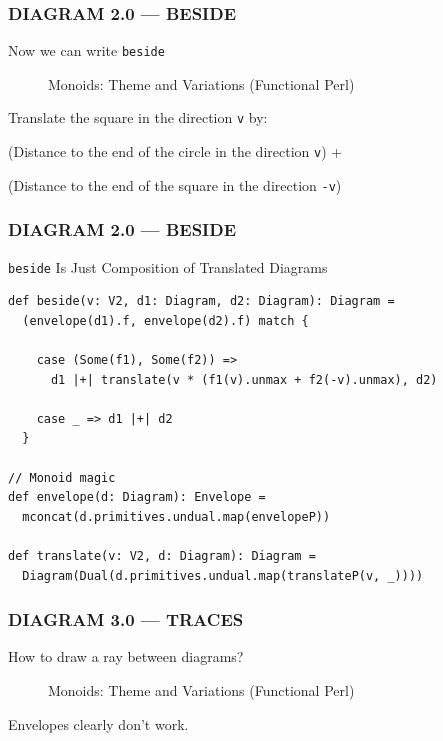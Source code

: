 \documentclass{beamer}
\begin{document}
\begin{frame} \frametitle{DIAGRAM 2.0 --- BESIDE}
Now we can write \texttt{beside}
  \begin{figure}
      \centering
      \caption{Monoids: Theme and Variations (Functional Perl)}
  \end{figure}
  \vspace{-.5cm}
  Translate the square in the direction \texttt{v} by:

  (Distance to the end of the circle in the direction \texttt{v}) +

  (Distance to the end of the square in the direction \texttt{-v})
\end{frame}

\begin{frame}[fragile] \frametitle{DIAGRAM 2.0 --- BESIDE}
  \begin{block}{\texttt{beside} Is Just Composition of Translated Diagrams}
  \begin{lstlisting}
def beside(v: V2, d1: Diagram, d2: Diagram): Diagram =
  (envelope(d1).f, envelope(d2).f) match {

    case (Some(f1), Some(f2)) =>
      d1 |+| translate(v * (f1(v).unmax + f2(-v).unmax), d2)

    case _ => d1 |+| d2
  }

// Monoid magic
def envelope(d: Diagram): Envelope =
  mconcat(d.primitives.undual.map(envelopeP))

def translate(v: V2, d: Diagram): Diagram =
  Diagram(Dual(d.primitives.undual.map(translateP(v, _))))
  \end{lstlisting}
  \vspace{-0.4cm}
  \end{block}
\end{frame}

\begin{frame} \frametitle{DIAGRAM 3.0 --- TRACES}
How to draw a ray between diagrams?

  \begin{figure}
      \centering
      \caption{Monoids: Theme and Variations (Functional Perl)}
  \end{figure}

Envelopes clearly don't work.
\end{frame}
\end{document}

